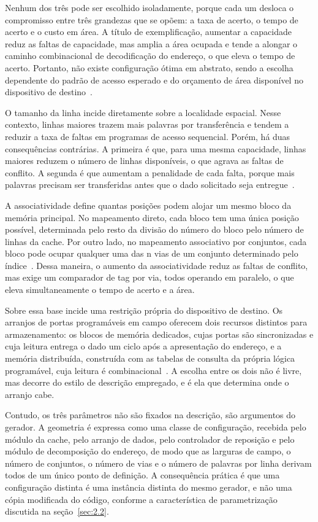 Nenhum dos três pode ser escolhido isoladamente, porque cada um desloca o compromisso entre três grandezas que se opõem: a taxa de acerto, o tempo de acerto e o custo em área. A título de exemplificação, aumentar a capacidade reduz as faltas de capacidade, mas amplia a área ocupada e tende a alongar o caminho combinacional de decodificação do endereço, o que eleva o tempo de acerto. Portanto, não existe configuração ótima em abstrato, sendo a escolha dependente do padrão de acesso esperado e do orçamento de área disponível no dispositivo de destino~\cite{patterson2020computer}.

O tamanho da linha incide diretamente sobre a localidade espacial. Nesse contexto, linhas maiores trazem mais palavras por transferência e tendem a reduzir a taxa de faltas em programas de acesso sequencial. Porém, há duas consequências contrárias. A primeira é que, para uma mesma capacidade, linhas maiores reduzem o número de linhas disponíveis, o que agrava as faltas de conflito. A segunda é que aumentam a penalidade de cada falta, porque mais palavras precisam ser transferidas antes que o dado solicitado seja entregue~\cite{patterson2020computer}.

A associatividade define quantas posições podem alojar um mesmo bloco da memória principal. No mapeamento direto, cada bloco tem uma única posição possível, determinada pelo resto da divisão do número do bloco pelo número de linhas da cache. Por outro lado, no mapeamento associativo por conjuntos, cada bloco pode ocupar qualquer uma das n vias de um conjunto determinado pelo índice~\cite{patterson2020computer}. Dessa maneira, o aumento da associatividade reduz as faltas de conflito, mas exige um comparador de tag por via, todos operando em paralelo, o que eleva simultaneamente o tempo de acerto e a área.

Sobre essa base incide uma restrição própria do dispositivo de destino. Os arranjos de portas programáveis em campo oferecem dois recursos distintos para armazenamento: os blocos de memória dedicados, cujas portas são sincronizadas e cuja leitura entrega o dado um ciclo após a apresentação do endereço, e a memória distribuída, construída com as tabelas de consulta da própria lógica programável, cuja leitura é combinacional~\cite{schoeberl2025chisel}. A escolha entre os dois não é livre, mas decorre do estilo de descrição empregado, e é ela que determina onde o arranjo cabe.

Contudo, os três parâmetros não são fixados na descrição, são argumentos do gerador. A geometria é expressa como uma classe de configuração, recebida pelo módulo da cache, pelo arranjo de dados, pelo controlador de reposição e pelo módulo de decomposição do endereço, de modo que as larguras de campo, o número de conjuntos, o número de vias e o número de palavras por linha derivam todos de um único ponto de definição. A consequência prática é que uma configuração distinta é uma instância distinta do mesmo gerador, e não uma cópia modificada do código, conforme a característica de parametrização discutida na seção~\ref{sec:2.2}.

